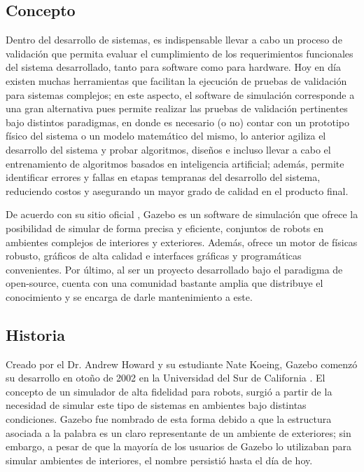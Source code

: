 \subsection{Concepto}
Dentro del desarrollo de sistemas, es indispensable llevar a cabo un proceso de validación que permita evaluar el cumplimiento de los requerimientos funcionales del sistema desarrollado, tanto para software como para hardware. Hoy en día existen muchas herramientas que facilitan la ejecución de pruebas de validación para sistemas complejos; en este aspecto, el software de simulación corresponde a una gran alternativa pues permite realizar las pruebas de validación pertinentes bajo distintos paradigmas, en donde es necesario (o no) contar con un prototipo físico del sistema o un modelo matemático del mismo, lo anterior agiliza el desarrollo del sistema y probar algoritmos, diseños e incluso llevar a cabo el entrenamiento de algoritmos basados en inteligencia artificial; además, permite identificar errores y fallas en etapas tempranas del desarrollo del sistema, reduciendo costos y asegurando un mayor grado de calidad en el producto final.

De acuerdo con su sitio oficial \cite{gazebo_2014}, Gazebo es un software de simulación que ofrece la posibilidad de simular de forma precisa y eficiente, conjuntos de robots en ambientes complejos de interiores y exteriores. Además, ofrece un motor de físicas robusto, gráficos de alta calidad e interfaces gráficas y programáticas convenientes. Por último, al ser un proyecto desarrollado bajo el paradigma de open-source, cuenta con una comunidad bastante amplia que distribuye el conocimiento y se encarga de darle mantenimiento a este.

\subsection{Historia}
Creado por el Dr. Andrew Howard y su estudiante Nate Koeing, Gazebo comenzó su desarrollo en otoño de 2002 en la Universidad del Sur de California \cite{gazebo_2014}. El concepto de un simulador de alta fidelidad para robots, surgió a partir de la necesidad de simular este tipo de sistemas en ambientes bajo distintas condiciones. Gazebo fue nombrado de esta forma debido a que la estructura asociada a la palabra es un claro representante de un ambiente de exteriores; sin embargo, a pesar de que la mayoría de los usuarios de Gazebo lo utilizaban para simular ambientes de interiores, el nombre persistió hasta el día de hoy.


